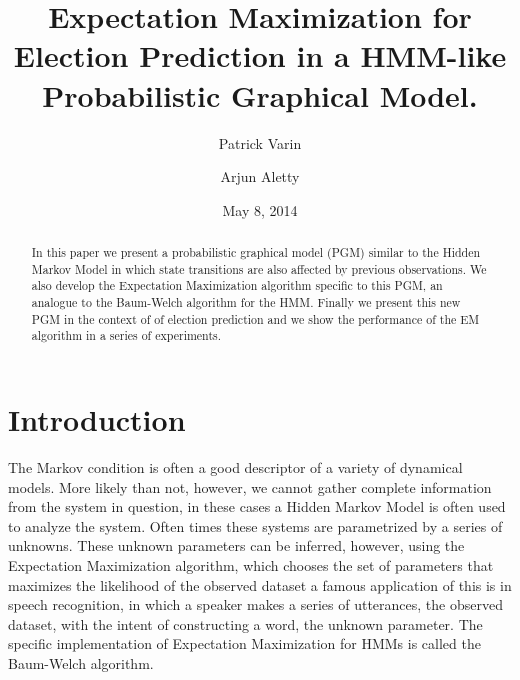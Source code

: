 \documentclass{amsart}
\theoremstyle{definition}
\theoremstyle{remark}
\numberwithin{equation}{section}
\begin{document}
\title{Expectation Maximization for Election Prediction in a HMM-like Probabilistic Graphical Model.}

\author{Patrick Varin}
\address{Olin Way, Olin College, Needham, Massachusetts 02492}

\author{Arjun Aletty}
\address{Olin Way, Olin College, Needham, Massachusetts 02492}


\date{May 8, 2014}



\begin{abstract}
In this paper we present a probabilistic graphical model (PGM) similar to the Hidden Markov Model in which state transitions are also affected by previous observations. We also develop the Expectation Maximization algorithm specific to this PGM, an analogue to the Baum-Welch algorithm for the HMM. Finally we present this new PGM in the context of of election prediction and we show the performance of the EM algorithm in a series of experiments.
\end{abstract}

\maketitle

\section{Introduction}
The Markov condition is often a good descriptor of a variety of dynamical models. More likely than not, however, we cannot gather complete information from the system in question, in these cases a Hidden Markov Model is often used to analyze the system. Often times these systems are parametrized by a series of unknowns. These unknown parameters can be inferred, however, using the Expectation Maximization algorithm, which chooses the set of parameters that maximizes the likelihood of the observed dataset a famous application of this is in speech recognition, in which a speaker makes a series of utterances, the observed dataset, with the intent of constructing a word, the unknown parameter. The specific implementation of Expectation Maximization for HMMs is called the Baum-Welch algorithm.
\end{document}
